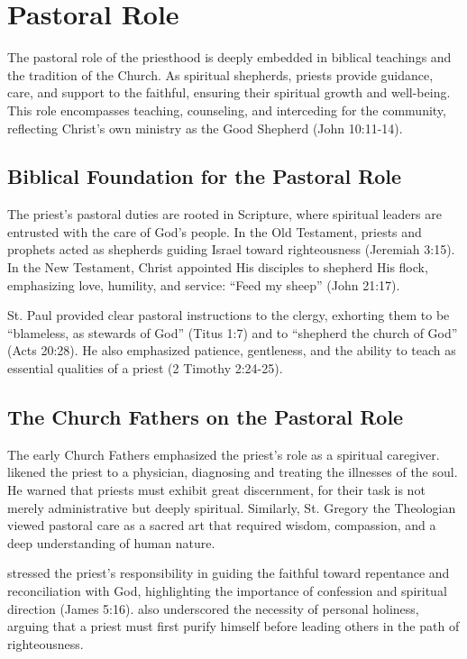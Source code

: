 \documentclass[12pt,doc]{apa7}   	%
\begin{document}
\section{Pastoral Role}\label{pastoral}

The pastoral role of the priesthood is deeply embedded in biblical teachings and the tradition of the Church. As spiritual shepherds, priests provide guidance, care, and support to the faithful, ensuring their spiritual growth and well-being. This role encompasses teaching, counseling, and interceding for the community, reflecting Christ’s own ministry as the Good Shepherd (John 10:11-14).

\subsection{Biblical Foundation for the Pastoral Role}

The priest’s pastoral duties are rooted in Scripture, where spiritual leaders are entrusted with the care of God’s people. In the Old Testament, priests and prophets acted as shepherds guiding Israel toward righteousness (Jeremiah 3:15). In the New Testament, Christ appointed His disciples to shepherd His flock, emphasizing love, humility, and service: ``Feed my sheep'' (John 21:17).

St. Paul provided clear pastoral instructions to the clergy, exhorting them to be ``blameless, as stewards of God'' (Titus 1:7) and to ``shepherd the church of God'' (Acts 20:28). He also emphasized patience, gentleness, and the ability to teach as essential qualities of a priest (2 Timothy 2:24-25).

\subsection{The Church Fathers on the Pastoral Role}

The early Church Fathers emphasized the priest’s role as a spiritual caregiver. \citet{priesthood_chrysostom,complete_work_chrysostom} likened the priest to a physician, diagnosing and treating the illnesses of the soul. He warned that priests must exhibit great discernment, for their task is not merely administrative but deeply spiritual. Similarly, St. Gregory the Theologian \citep{early_church_akin} viewed pastoral care as a sacred art that required wisdom, compassion, and a deep understanding of human nature.

\citet{priesthood_shenouda} stressed the priest’s responsibility in guiding the faithful toward repentance and reconciliation with God, highlighting the importance of confession and spiritual direction (James 5:16). \citet{st_basil_letters} also underscored the necessity of personal holiness, arguing that a priest must first purify himself before leading others in the path of righteousness.
\end{document}
